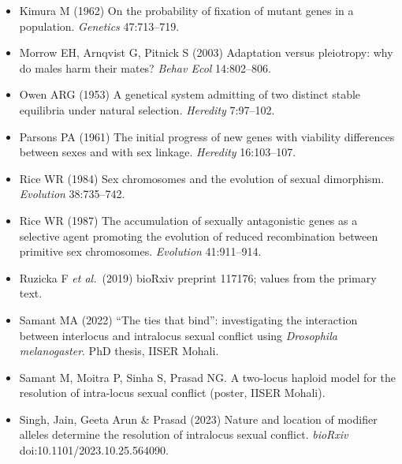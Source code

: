 \begin{itemize}[leftmargin=*,label={}]
\item Kimura M (1962) On the probability of fixation of mutant genes in a population. \emph{Genetics} 47:713--719.
\item Morrow EH, Arnqvist G, Pitnick S (2003) Adaptation versus pleiotropy: why do males harm their mates? \emph{Behav Ecol} 14:802--806.
\item Owen ARG (1953) A genetical system admitting of two distinct stable equilibria under natural selection. \emph{Heredity} 7:97--102.
\item Parsons PA (1961) The initial progress of new genes with viability differences between sexes and with sex linkage. \emph{Heredity} 16:103--107.
\item Rice WR (1984) Sex chromosomes and the evolution of sexual dimorphism. \emph{Evolution} 38:735--742.
\item Rice WR (1987) The accumulation of sexually antagonistic genes as a selective agent promoting the evolution of reduced recombination between primitive sex chromosomes. \emph{Evolution} 41:911--914.
\item Ruzicka F \emph{et al.}\ (2019) bioRxiv preprint 117176; values from the primary text.
\item Samant MA (2022) ``The ties that bind'': investigating the interaction between interlocus and intralocus sexual conflict using \emph{Drosophila melanogaster}. PhD thesis, IISER Mohali.
\item Samant M, Moitra P, Sinha S, Prasad NG. A two-locus haploid model for the resolution of intra-locus sexual conflict (poster, IISER Mohali).
\item Singh, Jain, Geeta Arun \& Prasad (2023) Nature and location of modifier alleles determine the resolution of intralocus sexual conflict. \emph{bioRxiv} doi:10.1101/2023.10.25.564090.
\end{itemize}
